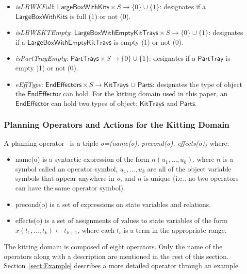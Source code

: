 \documentclass[a4paper, 10pt, conference]{ieeeconf}      %
\begin{document}
\begin{itemize}
\item \emph{isLBWKFull}: $\mathsf{LargeBoxWithKits}\times S\rightarrow \lbrace 0\rbrace \cup \lbrace 1\rbrace$: designates if a $\mathsf{LargeBoxWithKits}$ is full (1) or not (0).

\item \emph{isLBWEKTEmpty}: $\mathsf{LargeBoxWithEmptyKitTrays}\times S\rightarrow \lbrace 0\rbrace \cup \lbrace 1\rbrace$: designates if a $\mathsf{LargeBoxWithEmptyKitTrays}$ is empty (1) or not (0).

\item \emph{isPartTrayEmpty}: $\mathsf{PartTrays}\times S\rightarrow \lbrace 0\rbrace \cup \lbrace 1\rbrace$: designates if a $\mathsf{PartTray}$ is empty (1) or not (0).

\item \emph{eEffType}: $\mathsf{EndEffectors}\times S \rightarrow\mathsf{KitTrays}$ $\cup$ $\mathsf{Parts}$: designates the type of object the $\mathsf{EndEffector}$ can hold. For the kitting domain used in this paper, an $\mathsf{EndEffector}$ can hold two types of object: $\mathsf{KitTrays}$ and $\mathsf{Parts}$.
\end{itemize}

\subsubsection{Planning Operators and Actions for the Kitting Domain}
\label{subsect:Planning_Operators}
A planning operator~\cite{NAU.2004} is a triple \textit{o=(name(o), precond(o), effects(o))}
where:
\begin{itemize}
\item name(o) is a syntactic expression of the form $n(u_1,\dots,u_k)$, where $n$ is a symbol
called an operator symbol, $u_1,\dots,u_k$ are all of the object variable symbols that
appear anywhere in \textit{o}, and $n$ is unique (i.e., no two operators can have the
same operator symbol).
\item precond(o) is a set of expressions on state variables and relations.
\item effects(o) is a set of assignments of values to state variables of the form
$x(t_1,\dots,t_k)\leftarrow t_{k+1}$, where each $t_i$ is a term in the appropriate range.
\end{itemize}

The kitting domain is composed of eight operators. Only the name of the operators along with a description are mentioned in the rest of this section. Section~\ref{sect:Example} describes a more detailed operator through an example.
\end{document}
